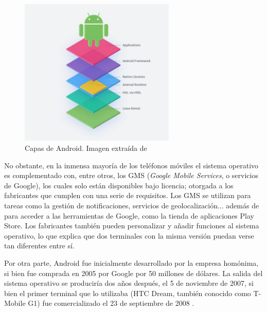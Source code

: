             \begin{figure}[h]
                \centering
                \includegraphics[width=0.66\textwidth]{figures/Android capas.jpg}
                \caption[Capas de Android.]
                {Capas de Android. Imagen extraída de \cite{perez_aosp_2019}}
                \label{figure:android:capas}
            \end{figure}

            No obstante, en la inmensa mayoría de los teléfonos móviles el sistema operativo es complementado con,
            entre otros, los GMS (\textit{Google Mobile Services}, o servicios de Google), los cuales solo están 
            disponibles bajo licencia; otorgada a los fabricantes que cumplen con una serie de requisitos. Los GMS 
            se utilizan para tareas como la gestión de notificaciones, servicios de geolocalización... además de para 
            acceder a las herramientas de Google, como la tienda de aplicaciones Play Store. Los fabricantes también 
            pueden personalizar y añadir funciones al sistema operativo, lo que explica que dos terminales con la misma 
            versión puedan verse tan diferentes entre sí. \newline
            

            Por otra parte, Android fue inicialmente desarrollado por la empresa homónima, si bien fue comprada en 2005
            por Google por 50 millones de dólares. La salida del sistema operativo se produciría dos años después, el 5 
            de noviembre de 2007, si bien el primer terminal que lo utilizaba (HTC Dream, también conocido como 
            T-Mobile G1) fue comercializado el 23 de septiembre de 2008 \cite{adeva_android_2023} \cite{marquez_asi_2022}.

